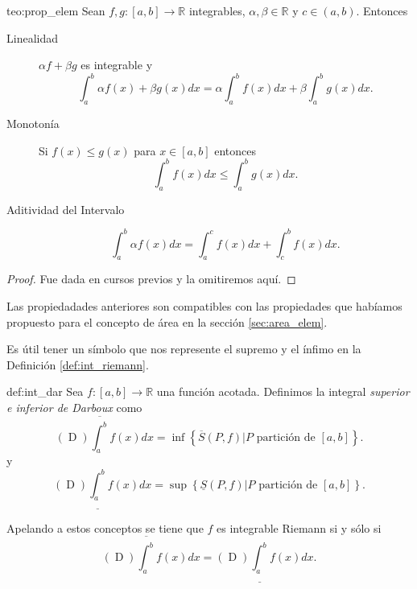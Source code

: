 \begin{teorema}{teo:prop_elem} Sean $f,g:[a,b]\to\mathbb{R}$ integrables, $\alpha,\beta\in\mathbb{R}$ y $c\in (a,b)$. Entonces
\begin{description}
 \item[Linealidad] $\alpha f+\beta g$ es integrable y 
 \[
  \int_a^b\alpha f(x)+\beta g(x)dx=\alpha \int_a^bf(x)dx+\beta\int_a^b g(x)dx.
 \]
 \item[Monotonía] Si $f(x)\leq g(x)$  para $x\in [a,b]$ entonces 
 \[
  \int_a^b f(x)dx\leq \int_a^b g(x)dx.
 \]
 \item[Aditividad del Intervalo]  \[
  \int_a^b\alpha f(x)dx= \int_a^cf(x)dx+\int_c^b f(x)dx.
 \]
\end{description}


\end{teorema}

\begin{proof} Fue dada en cursos previos y la omitiremos aquí. 
\end{proof}


\begin{observa} Las propiedadades anteriores son compatibles con las propiedades que habíamos propuesto para el concepto de área en la sección  \ref{sec:area_elem}.
\end{observa}



Es útil tener un símbolo que nos represente el supremo y el ínfimo en la Definición \ref{def:int_riemann}.

\begin{definicion}{def:int_dar}
 Sea $f:[a,b]\to\mathbb{R}$ una función acotada. Definimos la integral \emph{superior e inferior de Darboux}  como
\begin{equation}\label{eq:darboux_sup}
 (\mathop{D})\overline{\int_a^b}f(x)dx=\inf\left\{\overline{S}(P,f)| P \text{ partición de }[a,b]\right\}.
 \end{equation}
y
\begin{equation}\label{eq:darboux_inf}
 (\mathop{D})\underline{\int_a^b}f(x)dx=\sup\left\{\underline{S}(P,f)| P \text{ partición de }[a,b]\right\}.
 \end{equation}
\end{definicion}

Apelando a estos conceptos se tiene que $f$ es integrable Riemann si y sólo si 
\begin{equation}\label{eq:darboux_riemann}
 (\mathop{D})\overline{\int_a^b}f(x)dx= (\mathop{D})\underline{\int_a^b}f(x)dx .
 \end{equation}


